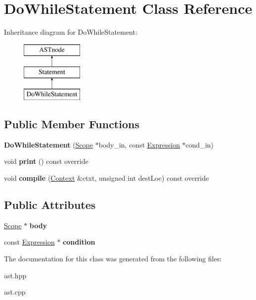 \hypertarget{class_do_while_statement}{}\section{Do\+While\+Statement Class Reference}
\label{class_do_while_statement}
Inheritance diagram for Do\+While\+Statement\+:\begin{figure}[H]
\begin{center}
\leavevmode
\includegraphics[height=3.000000cm]{class_do_while_statement}
\end{center}
\end{figure}
\subsection*{Public Member Functions}
\begin{DoxyCompactItemize}
\item 
\mbox{\label{class_do_while_statement_ab9d1bb6ed026a6fd502cba0fbe02b032}} 
{\bfseries Do\+While\+Statement} (\hyperlink{class_scope}{Scope} $\ast$body\+\_\+in, const \hyperlink{class_expression}{Expression} $\ast$cond\+\_\+in)
\item 
\mbox{\label{class_do_while_statement_ab870167480b6bec4854dbc9fae60f769}} 
void {\bfseries print} () const override
\item 
\mbox{\label{class_do_while_statement_a84a05bbf293d37c869afc13798a34043}} 
void {\bfseries compile} (\hyperlink{class_context}{Context} \&ctxt, unsigned int dest\+Loc) const override
\end{DoxyCompactItemize}
\subsection*{Public Attributes}
\begin{DoxyCompactItemize}
\item 
\mbox{\label{class_do_while_statement_a94d6fe1ebbc26b2ee9bbb1450a9570e7}} 
\hyperlink{class_scope}{Scope} $\ast$ {\bfseries body}
\item 
\mbox{\label{class_do_while_statement_ad16e911c382c07b4323d873103044596}} 
const \hyperlink{class_expression}{Expression} $\ast$ {\bfseries condition}
\end{DoxyCompactItemize}


The documentation for this class was generated from the following files\+:\begin{DoxyCompactItemize}
\item 
ast.\+hpp\item 
ast.\+cpp\end{DoxyCompactItemize}
